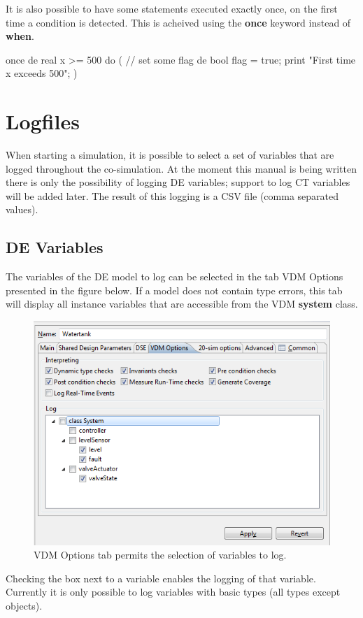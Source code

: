 \documentclass{crescendorepchap}
\newcommand{\vdmkeyw}[1]{{\bf\ttfamily #1}}
\begin{document}
It is also possible to have some statements executed exactly once, on
the first time a condition is detected. This is acheived using the
\vdmkeyw{once} keyword instead of \vdmkeyw{when}.

\begin{dcl}
once de real x >= 500 do
(
// set some flag
de bool flag = true;
print "First time x exceeds 500";
)
\end{dcl}

\section{Logfiles}\label{sec:Logfiles}

When starting a simulation, it is possible to select a set of variables
that are logged throughout the co-simulation. At the moment this manual
is being written there is only the possibility of logging DE variables;
support to log CT variables will be added later. The result of this
logging is a CSV file (comma separated values).

\subsection{DE Variables}

The variables of the DE model to log can be selected in the tab VDM
Options presented in the figure below. If a model does not contain type
errors, this tab will display all instance variables that are accessible
from the VDM \vdmkeyw{system} class.

\begin{figure}[htbp]
\centering
\includegraphics[width=.6\textwidth]{images/DestecsLoggingVariables.png}
\caption{VDM Options tab permits the selection of variables to log.}
\end{figure}

Checking the box next to a variable enables the logging of that
variable. Currently it is only possible to log variables with basic
types (all types except objects).
\end{document}
